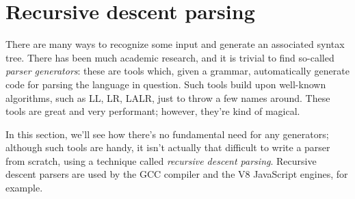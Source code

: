 \documentclass[12pt,american,draft]{PhdThesis}
\begin{document}
  \section{Recursive descent parsing}

  There are many ways to recognize some input and generate an associated syntax tree. There has been
  much academic research, and it is trivial to find so-called \emph{parser generators}: these are
  tools which, given a grammar, automatically generate code for parsing the language in question.
  Such tools build upon well-known algorithms, such as LL, LR, LALR, just to throw a few names
  around. These tools are great and very performant; however, they're kind of magical.

  In this section, we'll see how there's no fundamental need for any generators; although such tools
  are handy, it isn't actually that difficult to write a parser from scratch, using a technique
  called \emph{recursive descent parsing}. Recursive descent parsers are used by the GCC compiler
  and the V8 JavaScript engines, for example\cite{CIPERDP}.

  \backmatter





  \backmatter

  
  

\end{document}
